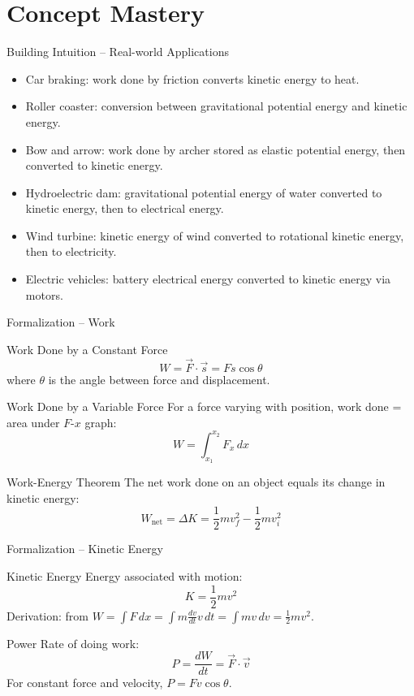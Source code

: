 \documentclass[11pt]{beamer}
\begin{document}
\section{Concept Mastery}

\begin{frame}{Building Intuition – Real-world Applications}
\begin{itemize}
    \item \alert{Car braking}: work done by friction converts kinetic energy to heat.
    \item \alert{Roller coaster}: conversion between gravitational potential energy and kinetic energy.
    \item \alert{Bow and arrow}: work done by archer stored as elastic potential energy, then converted to kinetic energy.
    \item \alert{Hydroelectric dam}: gravitational potential energy of water converted to kinetic energy, then to electrical energy.
    \item \alert{Wind turbine}: kinetic energy of wind converted to rotational kinetic energy, then to electricity.
    \item \alert{Electric vehicles}: battery electrical energy converted to kinetic energy via motors.
\end{itemize}
\end{frame}

\begin{frame}{Formalization – Work}
\begin{block}{Work Done by a Constant Force}
\[ W = \vec{F} \cdot \vec{s} = F s \cos\theta \]
where $\theta$ is the angle between force and displacement.
\end{block}
\begin{block}{Work Done by a Variable Force}
For a force varying with position, work done = area under $F$-$x$ graph:
\[ W = \int_{x_1}^{x_2} F_x \, dx \]
\end{block}
\begin{block}{Work-Energy Theorem}
The net work done on an object equals its change in kinetic energy:
\[ W_{\text{net}} = \Delta K = \frac12 m v_f^2 - \frac12 m v_i^2 \]
\end{block}
\end{frame}

\begin{frame}{Formalization – Kinetic Energy}
\begin{block}{Kinetic Energy}
Energy associated with motion:
\[ K = \frac12 m v^2 \]
Derivation: from $W = \int F\,dx = \int m \frac{dv}{dt} v\,dt = \int m v\, dv = \frac12 m v^2$.
\end{block}
\begin{block}{Power}
Rate of doing work:
\[ P = \frac{dW}{dt} = \vec{F} \cdot \vec{v} \]
For constant force and velocity, $P = F v \cos\theta$.
\end{block}
\end{frame}
\end{document}

